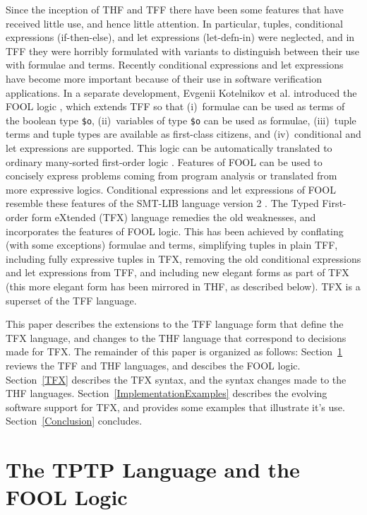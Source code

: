 \documentclass{easychair}
\begin{document}
Since the inception of THF and TFF there have been some features that have 
received little use, and hence little attention. 
In particular, tuples, conditional expressions (if-then-else), and let 
expressions (let-defn-in) were neglected, and in TFF they were horribly 
formulated with variants to distinguish between their use with formulae and 
terms. 
Recently conditional expressions and let expressions have become more 
important because of their use in software verification applications.
In a separate development, Evgenii Kotelnikov et al. introduced the FOOL logic
\cite{KKV15}, which extends TFF so that (i)~formulae can be used as terms 
of the boolean type {\tt \$o}, (ii)~variables of type {\tt \$o} can be used 
as formulae, (iii)~tuple terms and tuple types are available as first-class 
citizens, and (iv)~conditional and let expressions are supported. 
This logic can be automatically translated to ordinary many-sorted first-order
logic \cite{KK+16-GCAI}.
Features of FOOL can be used to concisely express problems coming from program
analysis \cite{KKV18} or translated from more expressive logics.
Conditional expressions and let expressions of FOOL resemble these features of
the SMT-LIB language version 2 \cite{BST10}.
The Typed First-order form eXtended (TFX) language remedies the
old weaknesses, and incorporates the features of FOOL logic.
This has been achieved by conflating (with some exceptions) formulae and 
terms, simplifying tuples in plain TFF, including fully expressive tuples in 
TFX, removing the old conditional expressions and let expressions from 
TFF, and including new elegant forms as part of TFX
(this more elegant form has been mirrored in THF, as described below).
TFX is a superset of the TFF language. 

This paper describes the extensions to the TFF language form that define the 
TFX language, and changes to the THF language that correspond to decisions 
made for TFX.
The remainder of this paper is organized as follows:
Section~\ref{TPTPFOOL} reviews the TFF and THF languages, and
descibes the FOOL logic.
Section~\ref{TFX} describes the TFX syntax, and the syntax changes made to
the THF languages.
Section~\ref{ImplementationExamples} describes the evolving software 
support for TFX, and provides some examples that illustrate it's use.
Section~\ref{Conclusion} concludes.

\section{The TPTP Language and the FOOL Logic}
\label{TPTPFOOL}
\end{document}
